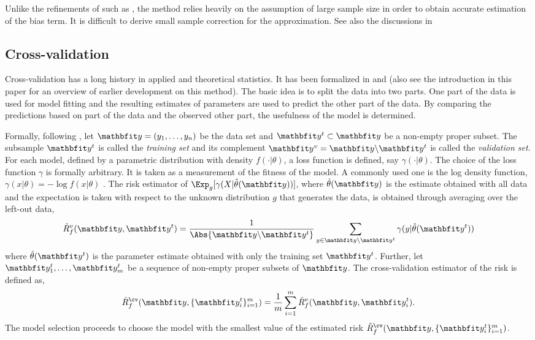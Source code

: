 Unlike the refinements of \aic such as \aicc, the \tic method relies heavily
on the assumption of large sample size in order to obtain accurate estimation
of the bias term. It is difficult to derive small sample correction for the
\tic approximation. See also the discussions in
\cite[][sec.~6.7.8]{Burnham:2002wc}

\subsection{Cross-validation}
\label{sub:Cross-validation}

Cross-validation has a long history in applied and theoretical statistics. It
has been formalized in \cite{Geisser:1975vx} and \cite{Stone:1974vx} (also
see the introduction in this paper for an overview of earlier development on
this method). The basic idea is to split the data into two parts. One part of
the data is used for model fitting and the resulting estimates of parameters
are used to predict the other part of the data. By comparing the predictions
based on part of the data and the observed other part, the usefulness of the
model is determined.

Formally, following \cite{Geisser:1975vx}, let $\data = (y_1,\dots,y_n)$ be
the data set and $\data^t\subset\data$ be a non-empty proper subset. The
subsample $\data^t$ is called the \emph{training set} and its complement
$\data^v = \data\backslash\data^t$ is called the \emph{validation set}. For
each model, defined by a parametric distribution with density
$f(\cdot|\theta)$, a loss function is defined, say $\gamma(\cdot|\theta)$.
The choice of the loss function $\gamma$ is formally arbitrary. It is taken
as a measurement of the fitness of the model. A commonly used one is the log
density function, $\gamma(x|\theta) = -\log f(x|\theta)$ \cite{Stone:1977vx}.
The risk estimator of $\Exp_g[\gamma(X|\hat\theta(\data))]$, where
$\hat\theta(\data)$ is the estimate obtained with all data and the
expectation is taken with respect to the unknown distribution $g$ that
generates the data, is obtained through averaging over the left-out data,
\begin{equation}
  \hat{R}_f^v(\data,\data^t) = \frac{1}{\Abs{\data\backslash\data^t}}
  \sum_{y\in\data\backslash\data^t}\gamma(y|\hat\theta(\data^t))
\end{equation}
where $\hat\theta(\data^t)$ is the parameter estimate obtained with only the
training set $\data^t$. Further, let $\data_1^t,\dots,\data_m^t$ be a
sequence of non-empty proper subsets of $\data$. The cross-validation
estimator of the risk is defined as,
\begin{equation}
  \hat{R}_f^{\cv}(\data,\{\data_i^t\}_{i=1}^m) =
  \frac{1}{m}\sum_{i=1}^m \hat{R}_f^v(\data,\data_i^t).
\end{equation}
The model selection proceeds to choose the model with the smallest value of the estimated risk $\hat{R}_f^{\cv}(\data,\{\data_i^t\}_{i=1}^m)$.

